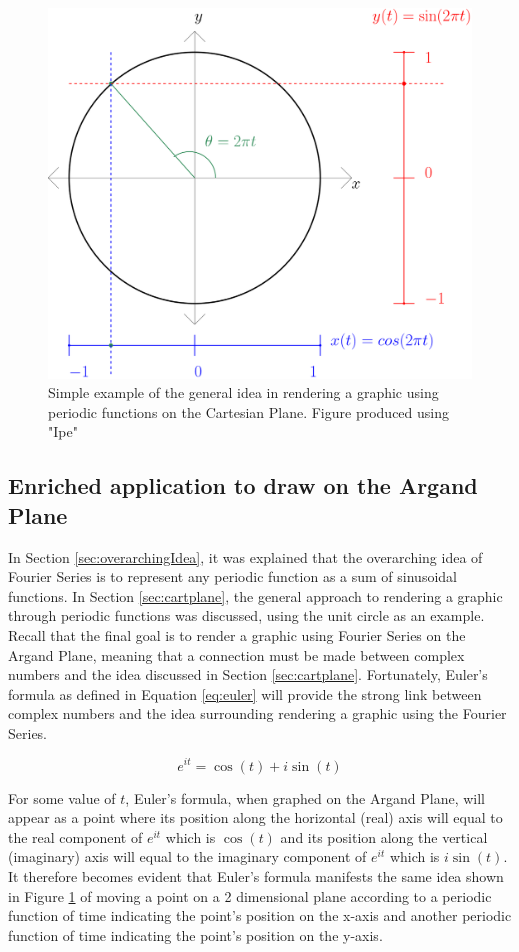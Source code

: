 \documentclass[letterpaper, 12pt]{article}
\begin{document}
\begin{figure}[H]
    \centering
    \includegraphics[width=.7\textwidth]{unitCircle.png}
    \caption{Simple example of the general idea in rendering a graphic using periodic functions on the Cartesian Plane. Figure produced using "Ipe" \protect\cite{IpeExtensibleDrawing}}
    \label{fig:unitCircle}
\end{figure}

\subsection{Enriched application to draw on the Argand Plane} \label{sec:big_guy}

In Section \ref*{sec:overarchingIdea}, it was explained that the overarching idea
of Fourier Series is to represent any periodic function as a sum of
sinusoidal functions. In Section \ref*{sec:cartplane}, the general
approach to rendering a graphic through periodic functions was discussed,
using the unit circle as an example. Recall that the final goal
is to render a graphic using Fourier Series on the Argand Plane,
meaning that a connection must be made between complex numbers and
the idea discussed in Section \ref*{sec:cartplane}. Fortunately,
Euler's formula as defined in Equation \ref*{eq:euler} will provide the strong link between
complex numbers and the idea surrounding rendering a graphic
using the Fourier Series.

\begin{equation}
    e^{it} = \cos(t) + i\sin(t)
    \label{eq:euler}
\end{equation}

For some value of \(t\), Euler's formula, when graphed on the Argand Plane,
will appear as a point where its position along the horizontal (real) axis
will equal to the real component of \(e^{it}\) which is \(\cos (t)\) and its
position along the vertical (imaginary) axis will equal to the imaginary
component of \(e^{it}\) which is \(i \sin (t)\). It therefore becomes
evident that Euler's formula manifests the same idea shown in Figure \ref*{fig:unitCircle} of moving
a point on a 2 dimensional plane according to a periodic function of time
indicating the point's position on the x-axis and another periodic
function of time indicating the point's position on the y-axis.
\end{document}
